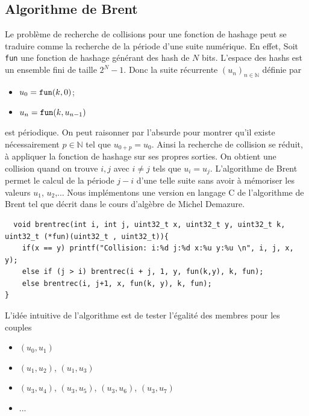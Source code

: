 \documentclass[11pt]{article}
\theoremstyle{definition}
\theoremstyle{definition}
\theoremstyle{definition}
\theoremstyle{theorem}
\theoremstyle{definition}
\begin{document}
\subsection{Algorithme de Brent}
Le problème de recherche de collisions pour une fonction de hashage peut se traduire
comme la recherche de la période d'une suite numérique. En effet,
Soit \texttt{fun} une fonction de hashage générant des hash de $N$ bits.
L'espace des hashs est un ensemble fini de taille $2^{N} - 1$.
Donc la suite récurrente $(u_n)_{n \in \mathbb{N}}$ définie par
\begin{itemize}
\item[] $u_0 = \hbox{\texttt{fun}}(k, 0)$;
\item[] $u_n = \hbox{\texttt{fun}}(k, u_{n-1})$
\end{itemize} 
est périodique. On peut raisonner par l'absurde pour montrer qu'il existe nécessairement $p \in \mathbb{N}$
tel que $u_{0+p} = u_0$.
Ainsi la recherche de collision se réduit, à appliquer la fonction
de hashage sur ses propres sorties.
On obtient une collision quand on trouve $i, j$ avec $i \neq j$ tels que
$u_i = u_j$. L'algorithme de Brent permet le calcul de la période $j-i$
d'une telle suite sans avoir à mémoriser les valeurs $u_1$, $u_2$,...
Nous implémentons une version en langage C de l'algorithme de Brent tel que décrit dans le cours d'algèbre de Michel Demazure\cite{DEM}.
\begin{verbatim}
  void brentrec(int i, int j, uint32_t x, uint32_t y, uint32_t k, uint32_t (*fun)(uint32_t , uint32_t)){
    if(x == y) printf("Collision: i:%d j:%d x:%u y:%u \n", i, j, x, y);
    else if (j > i) brentrec(i + j, 1, y, fun(k,y), k, fun);
    else brentrec(i, j+1, x, fun(k, y), k, fun);
}
\end{verbatim}
L'idée intuitive de l'algorithme est de tester l'égalité des membres pour les couples
\begin{itemize}
\item[]  $(u_0,u_1)$
\item[]  $(u_1, u_2)$, $(u_1, u_3)$
\item[]  $(u_3, u_4)$, $(u_3,u_5)$, $(u_3,u_6)$, $(u_3, u_7)$
\item[]  ...
\end{itemize}
\end{document}
